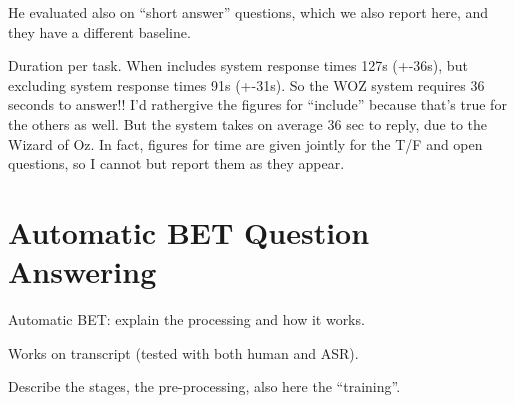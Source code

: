 \documentclass[11pt]{article}
\begin{document}
He evaluated also on ``short answer'' questions, which we also report here, and they have a different baseline.

Duration per task.  When includes system response times 127s (+-36s), but excluding system response times 91s (+-31s).  So the WOZ system requires 36 seconds to answer!!
I'd rathergive the figures for ``include'' because that's true for the others as well.  But the system takes on average 36 sec to reply, due to the Wizard of Oz.  In fact, figures for time are given jointly for the T/F and open questions, so I cannot but report them as they appear.





\section{Automatic BET Question Answering}
\label{sec:autobet}

Automatic BET: explain the processing and how it works.

Works on transcript (tested with both human and ASR).

Describe the stages, the pre-processing, also here the ``training''.
\end{document}
